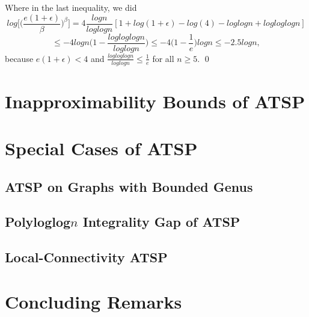 \documentclass[oneside]{projectpaper} %
\begin{document}
Where in the last inequality, we did
\begin{equation*}
log\Bigg[\bigg(\frac{e(1 + \epsilon)}{\beta}\bigg)^\beta\Bigg] = 4\frac{logn}{loglogn}[1 + log(1 + \epsilon) - log(4) - log log n + logloglogn]
\end{equation*}
\begin{equation*}
\leq -4logn\bigg(1-\frac{logloglogn}{loglogn}\bigg) \leq -4\bigg(1 - \frac{1}{e}\bigg)logn \leq -2.5logn,
\end{equation*}
\newline
because $e(1 + \epsilon) < 4$ and $\frac{logloglogn}{loglogn} \leq \frac{1}{e}$ for all $n \geq 5$. \hfill\qed
\section{Inapproximability Bounds of ATSP}

\section{Special Cases of ATSP}

\subsection{ATSP on Graphs with Bounded Genus}

\subsection{Polyloglog$n$ Integrality Gap of ATSP}

\subsection{Local-Connectivity ATSP}

\section{Concluding Remarks}


\nocite{*}


\end{document}
